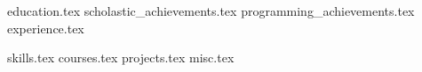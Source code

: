 \documentclass[11pt, a4paper]{awesome-cv}
\newcommand*{\sectiondir}{resume/}
\begin{document}
\makecvheader

{education.tex}
{scholastic_achievements.tex}
{programming_achievements.tex}
{experience.tex}

{skills.tex}
{courses.tex}
{projects.tex}
{misc.tex}
\end{document}
